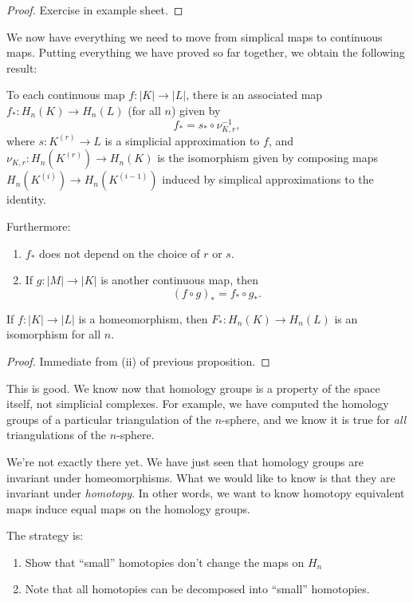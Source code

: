 \documentclass[a4paper]{article}
\begin{document}
\begin{proof}
  Exercise in example sheet.
\end{proof}

We now have everything we need to move from simplical maps to continuous maps. Putting everything we have proved so far together, we obtain the following result:

\begin{prop}
  To each continuous map $f: |K| \to |L|$, there is an associated map $f_*: H_n(K) \to H_n(L)$ (for all $n$) given by
  \[
    f_* = s_* \circ \nu_{K, r}^{-1},
  \]
  where $s: K^{(r)} \to L$ is a simplicial approximation to $f$, and $\nu_{K, r}: H_n (K^{(r)}) \to H_n(K)$ is the isomorphism given by composing maps $H_n(K^{(i)}) \to H_n(K^{(i - 1)})$ induced by simplical approximations to the identity.

  Furthermore:
  \begin{enumerate}
    \item $f_*$ does not depend on the choice of $r$ or $s$.
    \item If $g: |M| \to |K|$ is another continuous map, then
      \[
        (f \circ g)_* = f_* \circ g_*.
      \]
  \end{enumerate}
\end{prop}

\begin{cor}
  If $f: |K| \to |L|$ is a homeomorphism, then $F_*: H_n(K) \to H_n(L)$ is an isomorphism for all $n$.
\end{cor}

\begin{proof}
  Immediate from (ii) of previous proposition.
\end{proof}

This is good. We know now that homology groups is a property of the space itself, not simplicial complexes. For example, we have computed the homology groups of a particular triangulation of the $n$-sphere, and we know it is true for \emph{all} triangulations of the $n$-sphere.

We're not exactly there yet. We have just seen that homology groups are invariant under homeomorphisms. What we would like to know is that they are invariant under \emph{homotopy}. In other words, we want to know homotopy equivalent maps induce equal maps on the homology groups.

The strategy is:
\begin{enumerate}
  \item Show that ``small'' homotopies don't change the maps on $H_n$
  \item Note that all homotopies can be decomposed into ``small'' homotopies.
\end{enumerate}
\end{document}
